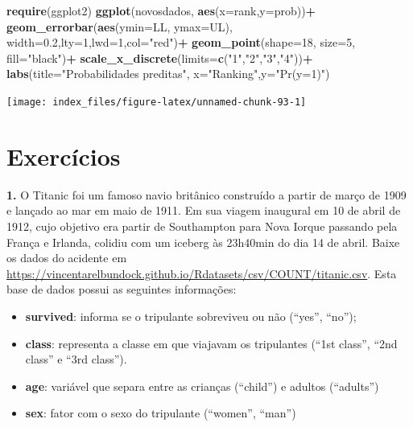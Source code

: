 \documentclass[12pt,brazil,oneside]{book}
\newenvironment{Shaded}{\begin{snugshade}}{\end{snugshade}}
\newcommand{\DataTypeTok}[1]{\textcolor[rgb]{0.13,0.29,0.53}{#1}}
\newcommand{\DecValTok}[1]{\textcolor[rgb]{0.00,0.00,0.81}{#1}}
\newcommand{\FloatTok}[1]{\textcolor[rgb]{0.00,0.00,0.81}{#1}}
\newcommand{\KeywordTok}[1]{\textcolor[rgb]{0.13,0.29,0.53}{\textbf{#1}}}
\newcommand{\NormalTok}[1]{#1}
\newcommand{\OperatorTok}[1]{\textcolor[rgb]{0.81,0.36,0.00}{\textbf{#1}}}
\newcommand{\StringTok}[1]{\textcolor[rgb]{0.31,0.60,0.02}{#1}}
\providecommand{\tightlist}{%
  \setlength{\itemsep}{0pt}\setlength{\parskip}{0pt}}
\begin{document}
\begin{Shaded}
\begin{Highlighting}[]
\KeywordTok{require}\NormalTok{(ggplot2)}
\KeywordTok{ggplot}\NormalTok{(novosdados, }\KeywordTok{aes}\NormalTok{(}\DataTypeTok{x=}\NormalTok{rank,}\DataTypeTok{y=}\NormalTok{prob))}\OperatorTok{+}
\StringTok{  }\KeywordTok{geom_errorbar}\NormalTok{(}\KeywordTok{aes}\NormalTok{(}\DataTypeTok{ymin=}\NormalTok{LL, }\DataTypeTok{ymax=}\NormalTok{UL), }\DataTypeTok{width=}\FloatTok{0.2}\NormalTok{,}\DataTypeTok{lty=}\DecValTok{1}\NormalTok{,}\DataTypeTok{lwd=}\DecValTok{1}\NormalTok{,}\DataTypeTok{col=}\StringTok{"red"}\NormalTok{)}\OperatorTok{+}
\StringTok{  }\KeywordTok{geom_point}\NormalTok{(}\DataTypeTok{shape=}\DecValTok{18}\NormalTok{, }\DataTypeTok{size=}\DecValTok{5}\NormalTok{, }\DataTypeTok{fill=}\StringTok{"black"}\NormalTok{)}\OperatorTok{+}
\StringTok{  }\KeywordTok{scale_x_discrete}\NormalTok{(}\DataTypeTok{limits=}\KeywordTok{c}\NormalTok{(}\StringTok{"1"}\NormalTok{,}\StringTok{"2"}\NormalTok{,}\StringTok{"3"}\NormalTok{,}\StringTok{"4"}\NormalTok{))}\OperatorTok{+}
\StringTok{  }\KeywordTok{labs}\NormalTok{(}\DataTypeTok{title=}\StringTok{"Probabilidades preditas"}\NormalTok{, }\DataTypeTok{x=}\StringTok{"Ranking"}\NormalTok{,}\DataTypeTok{y=}\StringTok{"Pr(y=1)"}\NormalTok{)}
\end{Highlighting}
\end{Shaded}

\begin{center}\texttt{[image: index\_files/figure-latex/unnamed-chunk-93-1]} \end{center}

\hypertarget{exercicios}{%
\section{Exercícios}\label{exercicios}}

\textbf{1.} O Titanic foi um famoso navio britânico construído a partir de março de 1909 e lançado ao mar em maio de 1911. Em sua viagem inaugural em 10 de abril de 1912, cujo objetivo era partir de Southampton para Nova Iorque passando pela França e Irlanda, colidiu com um iceberg às 23h40min do dia 14 de abril. Baixe os dados do acidente em
\url{https://vincentarelbundock.github.io/Rdatasets/csv/COUNT/titanic.csv}. Esta base de dados possui as seguintes informações:

\begin{itemize}
\tightlist
\item
  \textbf{survived}: informa se o tripulante sobreviveu ou não (``yes'', ``no'');
\item
  \textbf{class}: representa a classe em que viajavam os tripulantes (``1st class'', ``2nd class'' e ``3rd class'').
\item
  \textbf{age}: variável que separa entre as crianças (``child'') e adultos (``adults'')
\item
  \textbf{sex}: fator com o sexo do tripulante (``women'', ``man'')
\end{itemize}
\end{document}
